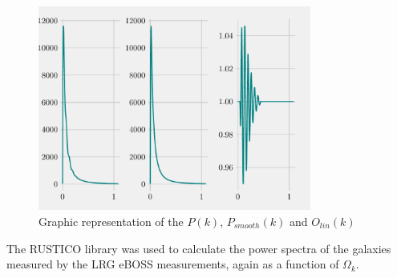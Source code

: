 \begin{figure}[t]
	\centering
	\includegraphics[width=0.8\textwidth]{../figs/PkOlPsm.pdf}
	\caption{Graphic representation of the $P(k)$, $P_{smooth}(k)$ and $O_{lin}(k)$}
	\label{fig:PkOlPsm}
\end{figure}

The RUSTICO library was used to calculate the power spectra of the galaxies measured by the LRG eBOSS measurements, again as a function of $\Omega_k$.

